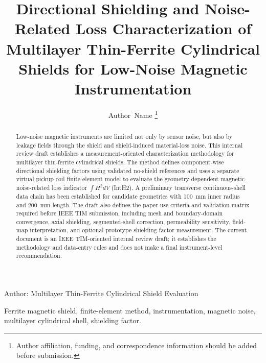 ﻿\documentclass[letterpaper,journal]{IEEEtran}
\begin{document}
\title{Directional Shielding and Noise-Related Loss Characterization of Multilayer Thin-Ferrite Cylindrical Shields for Low-Noise Magnetic Instrumentation}

\author{Author~Name%
\thanks{Author affiliation, funding, and correspondence information should be added before submission.}
}

%
{Author: Multilayer Thin-Ferrite Cylindrical Shield Evaluation}

\maketitle

\begin{abstract}
Low-noise magnetic instruments are limited not only by sensor noise, but also by leakage fields through the shield and shield-induced material-loss noise. This internal review draft establishes a measurement-oriented characterization methodology for multilayer thin-ferrite cylindrical shields. The method defines component-wise directional shielding factors using validated no-shield references and uses a separate virtual pickup-coil finite-element model to evaluate the geometry-dependent magnetic-noise-related loss indicator $\int H^2dV$ (IntH2). A preliminary transverse continuous-shell data chain has been established for candidate geometries with \SI{100}{mm} inner radius and \SI{200}{mm} length. The draft also defines the paper-use criteria and validation matrix required before IEEE TIM submission, including mesh and boundary-domain convergence, axial shielding, segmented-shell correction, permeability sensitivity, field-map interpretation, and optional prototype shielding-factor measurement. The current document is an IEEE TIM-oriented internal review draft; it establishes the methodology and data-entry rules and does not make a final instrument-level recommendation.
\end{abstract}

\begin{IEEEkeywords}
Ferrite magnetic shield, finite-element method, instrumentation, magnetic noise, multilayer cylindrical shell, shielding factor.
\end{IEEEkeywords}
\end{document}
